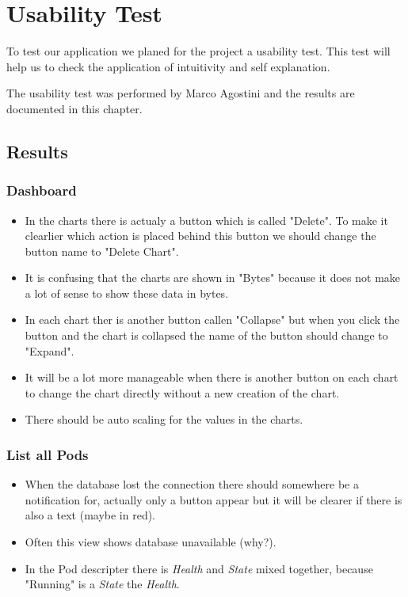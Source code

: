 \chapter{Usability Test}
To test our application we planed for the project a usability test. This test will help us to check the application of intuitivity and self explanation.

The usability test was performed by Marco Agostini and the results are documented in this chapter.

\section{Results}
\subsection{Dashboard}
\begin{itemize}
    \item In the charts there is actualy a button which is called "Delete". To make it clearlier which action is placed behind this button we should change the button name to "Delete Chart".
    \item It is confusing that the charts are shown in "Bytes" because it does not make a lot of sense to show these data in bytes.
    \item In each chart ther is another button callen "Collapse" but when you click the button and the chart is collapsed the name of the button should change to "Expand".
    \item It will be a lot more manageable when there is another button on each chart to change the chart directly without a new creation of the chart.
    \item There should be auto scaling for the values in the charts.
\end{itemize}

\subsection{List all Pods}
\begin{itemize}
    \item When the database lost the connection there should somewhere be a notification for, actually only a button appear but it will be clearer if there is also a text (maybe in red).
    \item Often this view shows database unavailable (why?).
    \item In the Pod descripter there is \textit{Health} and \textit{State} mixed together, because "Running" is a \textit{State} the \textit{Health}.
\end{itemize}

